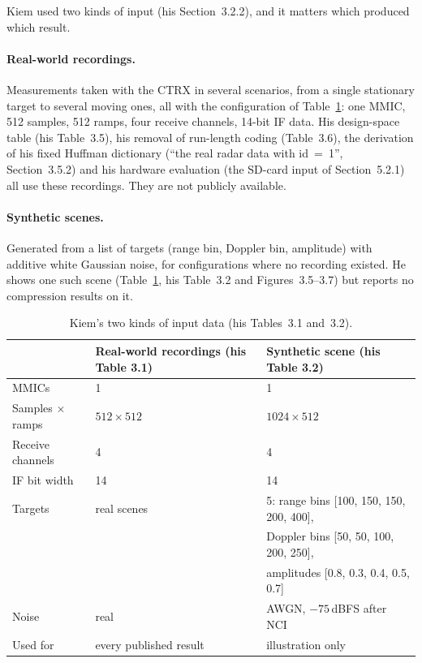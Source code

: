 Kiem used two kinds of input (his Section~3.2.2), and it matters which produced
which result.

\paragraph{Real-world recordings.} Measurements taken with the CTRX in several
scenarios, from a single stationary target to several moving ones, all with the
configuration of Table~\ref{tab:kc_data}: one MMIC, 512 samples, 512 ramps,
four receive channels, 14-bit IF data. His design-space table (his Table~3.5),
his removal of run-length coding (Table~3.6), the derivation of his fixed
Huffman dictionary (``the real radar data with id~=~1'', Section~3.5.2) and his
hardware evaluation (the SD-card input of Section~5.2.1) all use these
recordings. They are not publicly available.

\paragraph{Synthetic scenes.} Generated from a list of targets (range bin,
Doppler bin, amplitude) with additive white Gaussian noise, for configurations
where no recording existed. He shows one such scene (Table~\ref{tab:kc_data},
his Table~3.2 and Figures~3.5--3.7) but reports no compression results on it.

\begin{table}[htbp]
\centering
\caption[Kiem's data]{Kiem's two kinds of input data (his Tables~3.1
and~3.2).}
\label{tab:kc_data}
\small
\begin{tabular}{@{}lll@{}}
\toprule
& Real-world recordings (his Table 3.1) & Synthetic scene (his Table 3.2)\\
\midrule
MMICs & 1 & 1\\
Samples $\times$ ramps & $512 \times 512$ & $1024 \times 512$\\
Receive channels & 4 & 4\\
IF bit width & 14 & 14\\
Targets & real scenes & 5: range bins [100, 150, 150, 200, 400],\\
& & Doppler bins [50, 50, 100, 200, 250],\\
& & amplitudes [0.8, 0.3, 0.4, 0.5, 0.7]\\
Noise & real & AWGN, $-75$\,dBFS after NCI\\
Used for & every published result & illustration only\\
\bottomrule
\end{tabular}
\end{table}

